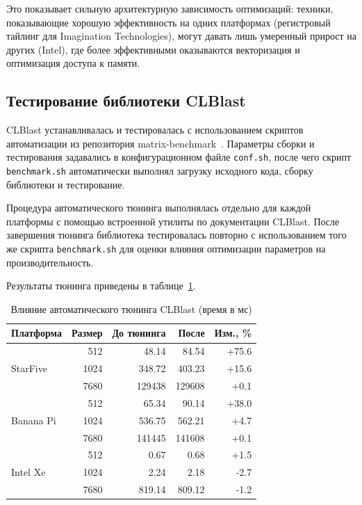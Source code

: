 Это показывает сильную архитектурную зависимость оптимизаций: техники, показывающие хорошую эффективность на одних платформах (регистровый тайлинг для Imagination Technologies), могут давать лишь умеренный прирост на других (Intel), где более эффективными оказываются векторизация и оптимизация доступа к памяти.

\subsection{Тестирование библиотеки CLBlast}

CLBlast устанавливалась и тестировалась с использованием скриптов автоматизации из репозитория matrix-benchmark~\cite{matrix_benchmark_repo}. Параметры сборки и тестирования задавались в конфигурационном файле \texttt{conf.sh}, после чего скрипт \texttt{benchmark.sh} автоматически выполнял загрузку исходного кода, сборку библиотеки и тестирование.

Процедура автоматического тюнинга выполнялась отдельно для каждой платформы с помощью встроенной утилиты по документации CLBlast. После завершения тюнинга библиотека тестировалась повторно с использованием того же скрипта \texttt{benchmark.sh} для оценки влияния оптимизации параметров на производительность.

Результаты тюнинга приведены в таблице~\ref{tab:tuning_effect}.

\begin{table}[h!]
\centering
\caption{Влияние автоматического тюнинга CLBlast (время в мс)}
\label{tab:tuning_effect}
\begin{tabular}{|l|r|r|r|r|}
\hline
\textbf{Платформа} & \textbf{Размер} & \textbf{До тюнинга} & \textbf{После} & \textbf{Изм., \%} \\
\hline
\multirow{3}{*}{StarFive} & 512 & 48.14 & 84.54 & +75.6 \\
 & 1024 & 348.72 & 403.23 & +15.6 \\
 & 7680 & 129438 & 129608 & +0.1 \\
\hline
\multirow{3}{*}{Banana Pi} & 512 & 65.34 & 90.14 & +38.0 \\
 & 1024 & 536.75 & 562.21 & +4.7 \\
 & 7680 & 141445 & 141608 & +0.1 \\
\hline
\multirow{3}{*}{Intel Xe} & 512 & 0.67 & 0.68 & +1.5 \\
 & 1024 & 2.24 & 2.18 & -2.7 \\
 & 7680 & 819.14 & 809.12 & -1.2 \\
\hline
\end{tabular}
\end{table}

